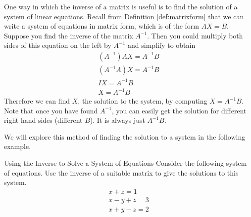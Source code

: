One way in which the inverse of a matrix is useful is to find the solution of a system of linear equations.
Recall from Definition \ref{def:matrixform} that we can write a system of equations in matrix form, 
which is of the form $AX=B$. Suppose you find the
inverse of the matrix $A^{-1}$. Then you could multiply both sides of this
equation on the left by $A^{-1}$ and simplify to obtain
\begin{equation*}
\begin{array}{c}
\left( A^{-1} \right) AX =A^{-1}B \\
\left(A^{-1}A\right) X = A^{-1}B \\
IX = A^{-1}B \\
X = A^{-1}B
\end{array}
\end{equation*}
Therefore we can find $X$, the solution to the system, by computing $X=A^{-1}B$. 
Note that once you
have found $A^{-1}$, you can easily get the solution for different right
hand sides (different $B$). It is always just $A^{-1}B$. 
 
We will explore this method of finding the solution to a system in the following example. 

\begin{example}{Using the Inverse to Solve a System of Equations}\label{exa:inversetosolvesystem}
 Consider the following system of
equations. Use the inverse of a suitable matrix to give the solutions to
this system.
\begin{equation*}
\begin{array}{c}
x+z=1 \\
x-y+z=3 \\
x+y-z=2
\end{array}
\end{equation*}
\end{example}


